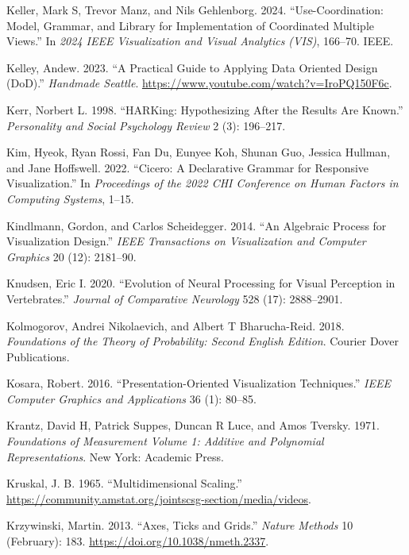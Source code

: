 \documentclass[
]{book}
\newlength{\cslhangindent}
\newenvironment{CSLReferences}[2] %
 {\begin{list}{}{%
  \setlength{\itemindent}{0pt}
  \setlength{\leftmargin}{0pt}
  \setlength{\parsep}{0pt}
  \ifodd #1
   \setlength{\leftmargin}{\cslhangindent}
   \setlength{\itemindent}{-1\cslhangindent}
  \fi
  \setlength{\itemsep}{#2\baselineskip}}}
 {\end{list}}
\theoremstyle{definition}
\theoremstyle{definition}
\theoremstyle{definition}
\theoremstyle{definition}
\theoremstyle{remark}
\begin{document}
\begin{CSLReferences}{1}{0}
Keller, Mark S, Trevor Manz, and Nils Gehlenborg. 2024. {``Use-Coordination: Model, Grammar, and Library for Implementation of Coordinated Multiple Views.''} In \emph{2024 IEEE Visualization and Visual Analytics (VIS)}, 166--70. IEEE.

Kelley, Andew. 2023. {``A Practical Guide to Applying Data Oriented Design (DoD).''} \emph{Handmade Seattle}. \url{https://www.youtube.com/watch?v=IroPQ150F6c}.

Kerr, Norbert L. 1998. {``HARKing: Hypothesizing After the Results Are Known.''} \emph{Personality and Social Psychology Review} 2 (3): 196--217.

Kim, Hyeok, Ryan Rossi, Fan Du, Eunyee Koh, Shunan Guo, Jessica Hullman, and Jane Hoffswell. 2022. {``Cicero: A Declarative Grammar for Responsive Visualization.''} In \emph{Proceedings of the 2022 CHI Conference on Human Factors in Computing Systems}, 1--15.

Kindlmann, Gordon, and Carlos Scheidegger. 2014. {``An Algebraic Process for Visualization Design.''} \emph{IEEE Transactions on Visualization and Computer Graphics} 20 (12): 2181--90.

Knudsen, Eric I. 2020. {``Evolution of Neural Processing for Visual Perception in Vertebrates.''} \emph{Journal of Comparative Neurology} 528 (17): 2888--2901.

Kolmogorov, Andrei Nikolaevich, and Albert T Bharucha-Reid. 2018. \emph{Foundations of the Theory of Probability: Second English Edition}. Courier Dover Publications.

Kosara, Robert. 2016. {``Presentation-Oriented Visualization Techniques.''} \emph{IEEE Computer Graphics and Applications} 36 (1): 80--85.

Krantz, David H, Patrick Suppes, Duncan R Luce, and Amos Tversky. 1971. \emph{Foundations of Measurement Volume 1: Additive and Polynomial Representations}. New York: Academic Press.

Kruskal, J. B. 1965. {``{Multidimensional Scaling}.''} \url{https://community.amstat.org/jointscsg-section/media/videos}.

Krzywinski, Martin. 2013. {``Axes, Ticks and Grids.''} \emph{Nature Methods} 10 (February): 183. \url{https://doi.org/10.1038/nmeth.2337}.


\end{CSLReferences}
\end{document}

